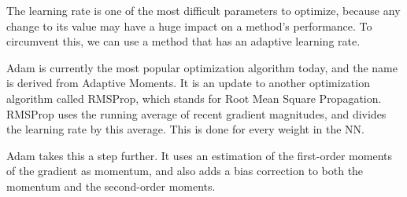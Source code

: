 The learning rate is one of the most difficult parameters to optimize, because any change to its value may have a huge impact on a method's performance. To circumvent this, we can use a method that has an adaptive learning rate. 

Adam is currently the most popular optimization algorithm today, and the name is derived from Adaptive Moments. It is an update to another optimization algorithm called RMSProp, which stands for Root Mean Square Propagation. RMSProp uses the running average of recent gradient magnitudes, and divides the learning rate by this average. This is done for every weight in the NN.

Adam takes this a step further. It uses an estimation of the first-order moments of the gradient as momentum, and also adds a bias correction to both the momentum and the second-order moments.

